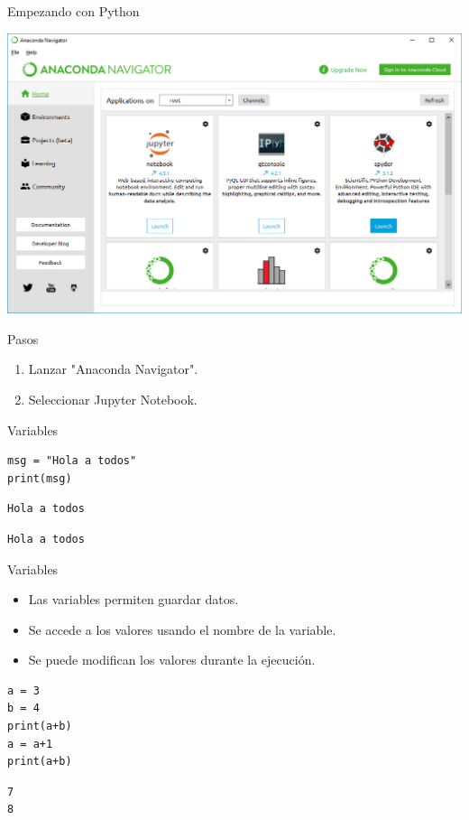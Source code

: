 \documentclass[bigger,unknownkeysallowed]{beamer}
\begin{document}
\begin{frame}[label={sec:org19b7e98}]{Empezando con Python}
\begin{center}
\includegraphics[width=.9\linewidth]{anaconda_navigator.png}
\end{center}

\begin{block}{Pasos}
\begin{enumerate}
\item Lanzar "Anaconda Navigator".

\item Seleccionar Jupyter Notebook.
\end{enumerate}
\end{block}
\end{frame}

\begin{frame}[fragile,label={sec:org98517c1}]{Variables}
 \begin{block}{}
\begin{verbatim}
msg = "Hola a todos"
print(msg)
\end{verbatim}
\begin{verbatim}
Hola a todos
\end{verbatim}

\begin{verbatim}
Hola a todos
\end{verbatim}
\end{block}

\begin{block}{Variables}
\begin{itemize}
\item Las variables permiten guardar datos.
\item Se accede a los valores usando el nombre de la variable.
\item Se puede modifican los valores durante la ejecución.
\end{itemize}
\end{block}

\begin{block}{}
\begin{verbatim}
a = 3
b = 4
print(a+b)
a = a+1
print(a+b)
\end{verbatim}
\scriptsize
\begin{verbatim}
7
8
\end{verbatim}
\end{block}
\end{frame}
\end{document}
